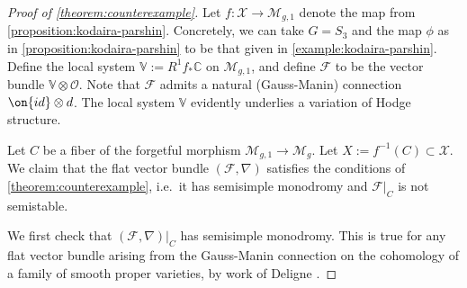 \documentclass[12 pt]{amsart}
\theoremstyle{plain}
\theoremstyle{definition}
\theoremstyle{remark}
\numberwithin{equation}{section}
\begin{document}
\subsubsection{}
\label{subsubsection:proof-counterexample}
\begin{proof}[Proof of \autoref{theorem:counterexample}]
Let $f: \mathscr X \to \mathscr{M}_{g,1}$ denote the map from
\autoref{proposition:kodaira-parshin}. 
Concretely, we can take $G = S_3$ and the map $\phi$ as in 
\autoref{proposition:kodaira-parshin} to be that given in
\autoref{example:kodaira-parshin}.
Define the local system $\mathbb V := R^1 f_* \mathbb C$ on $\mathscr M_{g,1}$,
and define $\mathscr{F}$ to be the vector bundle $\mathbb{V}\otimes
\mathscr{O}$. Note that $\mathscr{F}$ admits a natural (Gauss-Manin) connection $\on{id}\otimes d$. The local system $\mathbb{V}$ evidently underlies a variation of Hodge structure.

 Let $C$ be a
 fiber of the forgetful morphism $\mathscr{M}_{g,1}\to \mathscr{M}_{g}$.
 Let $X := f^{-1}(C) \subset \mathscr X$. We claim that the flat vector bundle $(\mathscr{F}, \nabla)$ satisfies the
conditions of \autoref{theorem:counterexample}, i.e.~it has semisimple monodromy and $\mathscr{F}|_C$ is not semistable.

We first check that $(\mathscr{F}, \nabla)|_C$ has semisimple monodromy. This is
true for any flat vector bundle arising from the Gauss-Manin connection on the
cohomology of a family of smooth proper varieties, by work of Deligne
\cite[Th\'eor\`eme 4.2.6]{deligne:hodge-ii}.


\end{proof}
\end{document}

